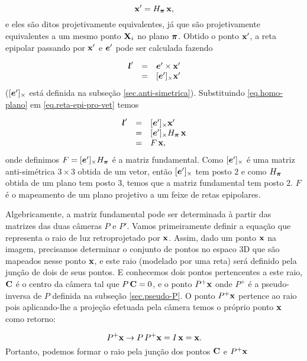 \begin{equation}\label{eq.homo-plano}
\mathbf{x}'= H_{\boldsymbol{\pi}} \,\mathbf{x},
\end{equation}
e eles são ditos projetivamente equivalentes, já que são projetivamente equivalentes a um mesmo ponto $\mathbf{X}_i$ no plano $\boldsymbol{\pi}$. Obtido o ponto $\mathbf{x}'$, a reta epipolar passando por $\mathbf{x}'$ e $\boldsymbol{e}'$ pode ser calculada fazendo 

\begin{equation}\label{eq.reta-epi-pro-vet}
\begin{array}{rcl}
\boldsymbol{l}'&=&\boldsymbol{e}'\times\mathbf{x}'\\
&=&[\boldsymbol{e}']_\times\mathbf{x}'
\end{array}
\end{equation}
($[\boldsymbol{e}']_\times$ está definida na subseção \ref{sec.anti-simetrica}). Substituindo \ref{eq.homo-plano} em \ref{eq.reta-epi-pro-vet} temos

\begin{equation*}
\begin{array}{rcl}
\boldsymbol{l}'&=&[\boldsymbol{e}']_\times\mathbf{x}'\\
&=&[\boldsymbol{e}']_\times H_{\boldsymbol{\pi}} \,\mathbf{x}\\
&=&F\,\mathbf{x},
\end{array}
\end{equation*} 
onde definimos $F=[\boldsymbol{e}']_\times H_{\boldsymbol{\pi}}$ é a matriz fundamental. Como $[\boldsymbol{e}']_\times$ é uma matriz anti-simétrica $3\times3$ obtida de um vetor, então  $[\boldsymbol{e}']_\times$ tem posto $2$ e como $H_{\boldsymbol{\pi}}$ obtida de um plano tem posto $3$, temos que a matriz fundamental tem posto $2$. $F$ é o mapeamento de um plano projetivo a um feixe de retas epipolares.


Algebricamente, a matriz fundamental pode ser determinada à partir das matrizes das duas câmeras $P$ e $P'$. Vamos primeiramente definir a equação que representa o raio de luz retroprojetado por $\mathbf{x}$. Assim, dado um ponto $\mathbf{x}$ na imagem, precisamos determinar o conjunto de pontos no espaco 3D que são mapeados nesse ponto $\mathbf{x}$, e este raio (modelado por uma reta) será definido pela junção de dois de seus pontos. E conhecemos dois pontos pertencentes a este raio, ${\bf C}$ é o centro da câmera tal que $P\,{\bf C}=0$, e o ponto $P^+\mathbf{x}$ onde $P^+$ é a pseudo-inversa de $P$ definida na subseção \ref{sec.pseudo-P}. O ponto $P^+\mathbf{x}$ pertence ao raio pois aplicando-lhe a projeção efetuada pela câmera temos o próprio ponto $\mathbf{x}$ como retorno:

\begin{equation*}
P^+\mathbf{x} \rightarrow P\,P^+\mathbf{x}=I\,\mathbf{x}=\mathbf{x}.
\end{equation*}
Portanto, podemos formar o raio pela junção dos pontos ${\bf C}$ e $P^+\mathbf{x}$

